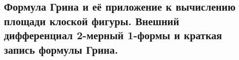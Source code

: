 \subsection{Формула Грина и её приложение к вычислению площади клоской фигуры. Внешний дифференциал 2-мерный 1-формы и краткая запись формулы Грина.}